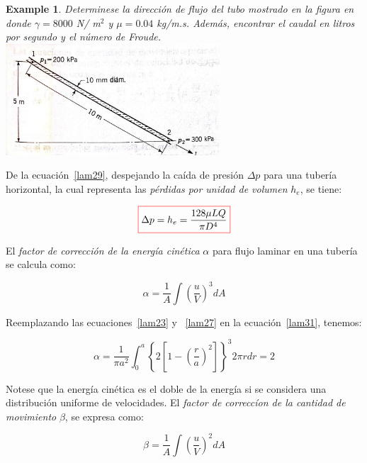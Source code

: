 \documentclass[11pt, oneside]{article}
\newtheorem{exa}{Example}
\begin{document}
\begin{shaded}
\begin{exa}
Determinese la direcci\'on de flujo del tubo mostrado en la figura en donde $\gamma = 8000$ N/ m$^2$ y $\mu = 0.04$ kg/m.s. Adem\'as, encontrar el caudal en litros por segundo y el n\'umero de Froude.
\includegraphics[width=8cm]{exa1.jpeg}
\end{exa}
\end{shaded}

De la ecuaci\'on~\ref{lam29}, despejando la ca\'ida de presi\'on $\Delta p$ para una tuber\'ia horizontal, la cual representa las \emph{p\'erdidas por unidad de volumen} $h_e$, se tiene:

\begin{equation}
\color{red}\boxed{\color{black} \Delta p = h_e = \frac{128 \mu LQ}{\pi D^4} }
\label{lam311}
\end{equation}

El \emph{factor de correcci\'on de la energ\'ia cin\'etica} $\alpha$ para flujo laminar en una tuber\'ia se calcula como:

\begin{equation}
\alpha = \frac{1}{A} \int \left ( \frac{u}{V} \right )^3 dA
\label{lam31}
\end{equation}

Reemplazando las ecuaciones~\ref{lam23} y ~\ref{lam27} en la ecuaci\'on~\ref{lam31}, tenemos:

\begin{equation}
\alpha = \frac{1}{\pi a^2} \int_0^a \left\{ 2 \left[ 1- \left(\frac{r}{a}\right)^2 \right] \right\}^3 2\pi r dr = 2
\label{lam32}
\end{equation}

Notese que la energ\'ia cin\'etica es el doble de la energ\'ia si se considera una distribuci\'on uniforme de velocidades. El \emph{factor de correcc\'ion de la cantidad de movimiento} $\beta$, se expresa como:

\begin{equation}
\beta = \frac{1}{A} \int \left ( \frac{u}{V} \right )^2 dA
\label{lam33}
\end{equation}
\end{document}
